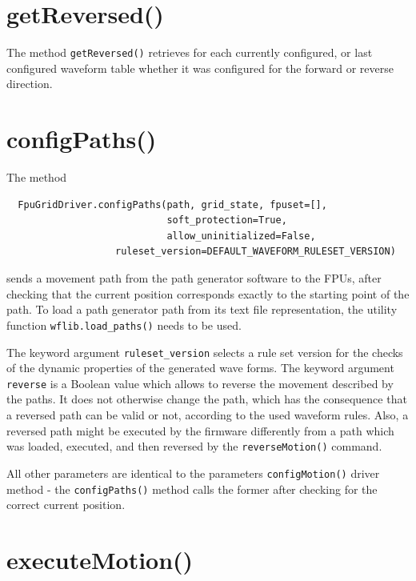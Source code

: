 \documentclass[fontsize=12,a4paper]{scrreprt}
\begin{document}
\section{getReversed()}
 The method \texttt{getReversed()}
retrieves for each currently configured, or last configured waveform
table whether it was configured for the forward or reverse direction.


\section{configPaths()}
\label{sec:configpaths}

The method
\begin{verbatim}
  FpuGridDriver.configPaths(path, grid_state, fpuset=[],
                            soft_protection=True,
                            allow_uninitialized=False,
                   ruleset_version=DEFAULT_WAVEFORM_RULESET_VERSION)
\end{verbatim}
sends a movement path from the path generator software to the FPUs,
after checking that the current position corresponds exactly to the
starting point of the path.  To load a path generator path from its
text file representation, the utility function
\texttt{wflib.load\_paths()} needs to be used.

The keyword argument \texttt{ruleset\_version} selects a rule set
version for the checks of the dynamic properties of the generated wave
forms. The keyword argument \texttt{reverse} is a Boolean value which
allows to reverse the movement described by the paths. It does not
otherwise change the path, which has the consequence that a reversed
path can be valid or not, according to the used waveform rules. Also,
a reversed path might be executed by the firmware differently from a
path which was loaded, executed, and then reversed by the
\texttt{reverseMotion()} command.

All other parameters are identical to the parameters
\texttt{configMotion()} driver method - the \texttt{configPaths()}
method calls the former after checking for the correct current
position.


\section{executeMotion()}
\end{document}
